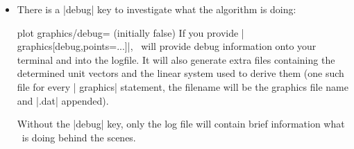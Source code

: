 {{\begin{itemize}
	\item There is a |debug| key to investigate what the algorithm is doing:
\begin{pgfplotskey}{plot graphics/debug= (initially false)}
	If you provide | graphics[debug,points={...}]|, \PGFPlots\ will provide debug information onto your terminal and into the logfile. It will also generate extra files containing the determined unit vectors and the linear system used to derive them (one such file for every | graphics| statement, the filename will be the graphics file name and |.dat| appended).

	Without the |debug| key, only the log file will contain brief information what \PGFPlots\ is doing behind the scenes. 
\end{pgfplotskey}
\end{itemize}
}

}%
